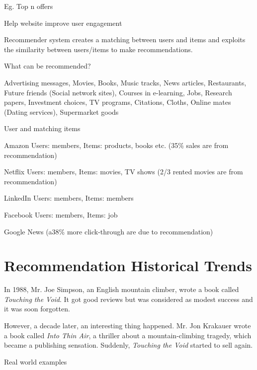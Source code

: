 \begin{bulletedlist}
\begin{bulletedlist}
\begin{bulletedlist}
				\item Eg. Top n offers
			\end{bulletedlist}
			\item Help website improve user engagement
		\end{bulletedlist}
		\item Recommender system creates a matching between users and items and exploits the similarity between users/items to make recommendations.
		\item What can be recommended?
		\begin{bulletedlist}
			\item Advertising messages, Movies, Books, Music tracks, News articles, Restaurants, Future friends (Social network sites), Courses in e-learning, Jobs, Research papers, Investment choices, TV programs, Citations, Cloths, Online mates (Dating services), Supermarket goods
		\end{bulletedlist}
		\item User and matching items
		\begin{bulletedlist}
			\item Amazon Users: members, Items: products, books etc. (35\% sales are from recommendation)
			\item Netflix Users: members, Items: movies, TV shows (2/3 rented movies are from recommendation)
			\item LinkedIn Users: members, Items: members
			\item Facebook Users: members, Items: job
			\item Google News (a38\% more click-through are due to recommendation)
		\end{bulletedlist}
	\end{bulletedlist}

	\section{Recommendation Historical Trends}
In 1988, Mr. Joe Simpson, an English mountain climber, wrote a book called \textit{Touching the Void}.  It got good reviews but was considered as modest success and it was soon forgotten.

However, a decade later, an interesting thing happened. Mr. Jon Krakauer wrote a book called \textit{Into Thin Air}, a thriller about a
mountain-climbing tragedy, which became a publishing sensation. Suddenly, \textit{Touching the Void} started to sell again.

Real world examples


